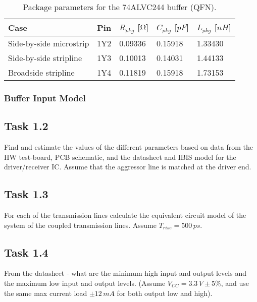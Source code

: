 \documentclass[../main.tex]{subfiles}
\begin{document}
\begin{table}[h]
    \centering
    \begin{tabular}{l|l l l l}
        \toprule[1pt]
        \textbf{Case} & \textbf{Pin} & $R_{pkg}$ [$\si{\ohm}$] & $C_{pkg}$ [$\si{pF}$] & $L_{pkg}$ [$\si{nH}$] \\
        \midrule
        Side-by-side microstrip & 1Y2 & 0.09336 & 0.15918 & 1.33430 \\
        Side-by-side stripline  & 1Y3 & 0.10013 & 0.14031 & 1.44133 \\
        Broadside stripline     & 1Y4 & 0.11819 & 0.15918 & 1.73153 \\
        \bottomrule[1pt]
    \end{tabular}
    \caption{Package parameters for the 74ALVC244 buffer (QFN).}
    \label{tab:pkg-params}
\end{table}

\newpage


\subsubsection{Buffer Input Model}

\subsection{Task 1.2}

Find and estimate the values of the different parameters based on data from the HW test-board, PCB schematic, and the datasheet and IBIS model for the driver/receiver IC. Assume that the aggressor line is matched at the driver end.

\solution

\subsection{Task 1.3}

For each of the transmission lines calculate the equivalent circuit model of the system of the coupled transmission lines. Assume $T_{rise} = 500\,\si{ps}$.

\solution

\subsection{Task 1.4}

From the datasheet - what are the minimum high input and output levels and the maximum low input and output levels. (Assume $V_{CC} = 3.3\,\si{V} \pm 5\%$, and use the same max current load $\pm 12 \,\si{mA}$ for both output low and high).
\end{document}
